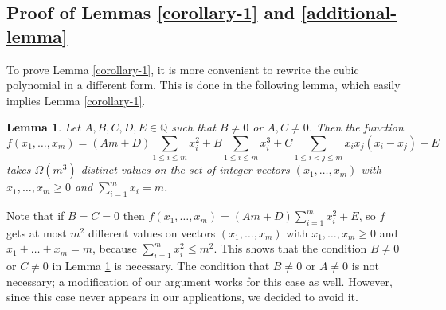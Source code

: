 \documentclass[11pt]{article}
\theoremstyle{plain}
\newtheorem{lemma}[theorem]{Lemma}
\begin{document}
\subsection{Proof of Lemmas \ref{corollary-1} and \ref{additional-lemma}}\label{sec:cubic forms}



To prove Lemma \ref{corollary-1}, it is more convenient to rewrite the cubic polynomial in a different form. This is done in the following lemma, which easily implies Lemma \ref{corollary-1}.

\begin{lemma} \label{general-values-lemma}
    Let $A,B,C,D,E \in \mathbb{Q}$ such that $B \neq 0$ or $A,C \neq 0$.
    Then the function 
	$$
	f(x_1,\dots,x_m) = (Am+D) \sum_{1 \leq i \leq m} x_i^2 + 
	B \sum_{1 \leq i \leq m} x_i^3 + C \sum_{1 \leq i < j \leq m} x_i x_j (x_i - x_j)+E
	$$
    takes $\Omega(m^3)$ distinct values on the set of integer vectors $(x_1,\dots,x_m)$ with $x_1,\dots,x_m \geq 0$ and 
    $\sum_{i=1}^m x_i = m$.
\end{lemma}

Note that if $B=C=0$ then $f(x_1,\dots,x_m) = (Am+D)\sum_{i=1}^m x_i^2 + E$, so $f$ gets at most $m^2$ different values on 
vectors $(x_1,\dots,x_m)$ with $x_1,\dots,x_m \geq 0$ and $x_1 + \dots + x_m = m$, because $\sum_{i=1}^m x_i^2 \leq m^2$. 
This shows that the condition $B \neq 0$ or $C \neq 0$ in Lemma \ref{general-values-lemma} is necessary. 
The condition that $B \neq 0$ or $A \neq 0$ is not necessary; a modification of our argument works for this case as well. 
However, since this case never appears in our applications, we decided to avoid it.
\end{document}
